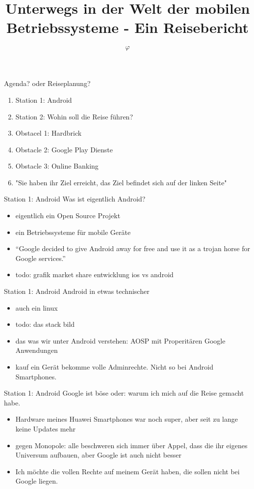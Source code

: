 \documentclass[14pt,compress,usenames,dvipsnames,aspectratio=169]{beamer}
\title{\textbf{Unterwegs in der Welt der mobilen Betriebssysteme - Ein Reisebericht}}
\author{\textbf{$\varphi$}}
\date{}
\begin{document}

\begin{frame}[plain]
\titlepage
\end{frame}

\begin{frame}{Agenda? oder Reiseplanung?}
    \begin{enumerate}
        \item Station 1: Android
        \item Station 2: Wohin soll die Reise führen?
        \item Obstacel 1: Hardbrick
        \item Obstacle 2: Google Play Dienste
        \item Obstacle 3: Online Banking
        \item "Sie haben ihr Ziel erreicht, das Ziel befindet sich auf der linken Seite"
    \end{enumerate}
\end{frame}

\begin{frame}{Station 1: Android}
    Was ist eigentlich Android? 
    \begin{itemize}
        \item eigentlich ein Open Source Projekt
        \item ein Betriebssysteme für mobile Geräte
        \item “Google decided to give Android away for free and use it as a trojan horse for Google services.”
        \item todo: grafik market share entwicklung ios vs android
    \end{itemize}
\end{frame}

\begin{frame}{Station 1: Android}
    Android in etwas technischer
    \begin{itemize}
        \item auch ein linux
        \item todo: das stack bild
        \item das was wir unter Android verstehen: AOSP mit Properitären Google Anwendungen
        \item kauf ein Gerät bekomme volle Adminrechte. Nicht so bei Android Smartphones.
    \end{itemize}
\end{frame}

\begin{frame}{Station 1: Android}
    Google ist böse oder: warum ich mich auf die Reise gemacht habe.
    \begin{itemize}
        \item Hardware meines Huawei Smartphones war noch super, aber seit zu lange keine Updates mehr 
        \item gegen Monopole: alle beschweren sich immer über Appel, dass die ihr eigenes Universum aufbauen, aber Google ist auch nicht besser
        \item Ich möchte die vollen Rechte auf meinem Gerät haben, die sollen nicht bei Google liegen.
    \end{itemize}
\end{frame}
\end{document}
